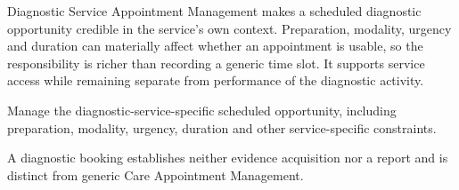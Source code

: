Diagnostic Service Appointment Management makes a scheduled diagnostic opportunity credible in the service's own context. Preparation, modality, urgency and duration can materially affect whether an appointment is usable, so the responsibility is richer than recording a generic time slot. It supports service access while remaining separate from performance of the diagnostic activity.



Manage the diagnostic-service-specific scheduled opportunity, including preparation, modality, urgency, duration and other service-specific constraints.



A diagnostic booking establishes neither evidence acquisition nor a report and is distinct from generic Care Appointment Management.


